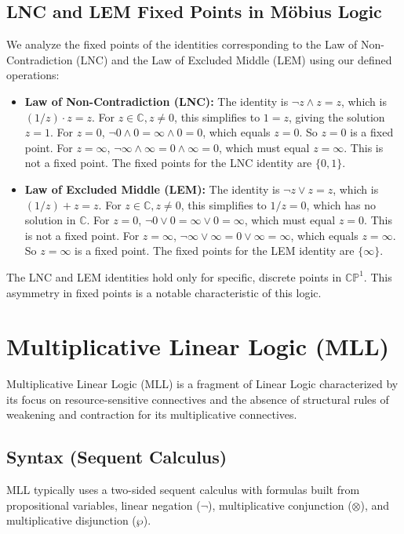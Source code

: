 	\subsection{LNC and LEM Fixed Points in Möbius Logic}
	We analyze the fixed points of the identities corresponding to the Law of Non-Contradiction (LNC) and the Law of Excluded Middle (LEM) using our defined operations:
	\begin{itemize}
		\item \textbf{Law of Non-Contradiction (LNC):} The identity is \(\neg z \wedge z = z\), which is \((1/z) \cdot z = z\).
		For \(z \in \mathbb{C}, z \neq 0\), this simplifies to \(1 = z\), giving the solution \(z=1\).
		For \(z=0\), \(\neg 0 \wedge 0 = \infty \wedge 0 = 0\), which equals \(z=0\). So \(z=0\) is a fixed point.
		For \(z=\infty\), \(\neg \infty \wedge \infty = 0 \wedge \infty = 0\), which must equal \(z=\infty\). This is not a fixed point.
		The fixed points for the LNC identity are \(\{0, 1\}\).
		\item \textbf{Law of Excluded Middle (LEM):} The identity is \(\neg z \vee z = z\), which is \((1/z) + z = z\).
		For \(z \in \mathbb{C}, z \neq 0\), this simplifies to \(1/z = 0\), which has no solution in \(\mathbb{C}\).
		For \(z=0\), \(\neg 0 \vee 0 = \infty \vee 0 = \infty\), which must equal \(z=0\). This is not a fixed point.
		For \(z=\infty\), \(\neg \infty \vee \infty = 0 \vee \infty = \infty\), which equals \(z=\infty\). So \(z=\infty\) is a fixed point.
		The fixed points for the LEM identity are \(\{\infty\}\).
	\end{itemize}
	The LNC and LEM identities hold only for specific, discrete points in \(\mathbb{CP}^1\). This asymmetry in fixed points is a notable characteristic of this logic.
	
	\section{Multiplicative Linear Logic (MLL)}
	
	Multiplicative Linear Logic (MLL) is a fragment of Linear Logic characterized by its focus on resource-sensitive connectives and the absence of structural rules of weakening and contraction for its multiplicative connectives.
	
	\subsection{Syntax (Sequent Calculus)}
	MLL typically uses a two-sided sequent calculus with formulas built from propositional variables, linear negation (\(\neg\)), multiplicative conjunction (\(\otimes\)), and multiplicative disjunction (\(\wp\)).
	
